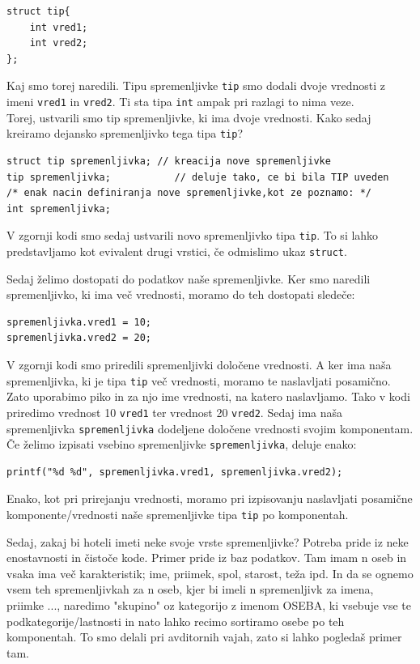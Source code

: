 \documentclass[a4paper, 12pt]{article}
\begin{document}
\begin{lstlisting}
struct tip{
	int vred1;
	int vred2;
};
\end{lstlisting}

Kaj smo torej naredili. Tipu spremenljivke \lstinline|tip| smo dodali dvoje vrednosti z imeni \lstinline|vred1| in \lstinline|vred2|. Ti sta tipa \lstinline|int| ampak pri razlagi to nima veze.\\
Torej, ustvarili smo tip spremenljivke, ki ima dvoje vrednosti. Kako sedaj kreiramo dejansko spremenljivko tega tipa \lstinline|tip|?

\begin{lstlisting}
struct tip spremenljivka; // kreacija nove spremenljivke
tip spremenljivka;			 // deluje tako, ce bi bila TIP uveden
/* enak nacin definiranja nove spremenljivke,kot ze poznamo: */
int spremenljivka;
\end{lstlisting}

V zgornji kodi smo sedaj ustvarili novo spremenljivko tipa \lstinline|tip|. To si lahko predstavljamo kot evivalent drugi vrstici, če odmislimo ukaz \lstinline|struct|. 

Sedaj želimo dostopati do podatkov naše spremenljivke. Ker smo naredili spremenljivko, ki ima več vrednosti, moramo do teh dostopati sledeče:

\begin{lstlisting}
spremenljivka.vred1 = 10;
spremenljivka.vred2 = 20;
\end{lstlisting}

V zgornji kodi smo priredili spremenljivki določene vrednosti. A ker ima naša spremenljivka, ki je tipa \lstinline|tip| več vrednosti, moramo te naslavljati posamično. Zato uporabimo piko in za njo ime vrednosti, na katero naslavljamo. Tako v kodi priredimo vrednost 10 \lstinline|vred1| ter vrednost 20 \lstinline|vred2|. Sedaj ima naša spremenljivka \lstinline|spremenljivka| dodeljene določene vrednosti svojim komponentam. Če želimo izpisati vsebino spremenljivke \lstinline|spremenljivka|, deluje enako:

\begin{lstlisting}
printf("%d %d", spremenljivka.vred1, spremenljivka.vred2);
\end{lstlisting}

Enako, kot pri prirejanju vrednosti, moramo pri izpisovanju naslavljati posamične komponente/vrednosti naše spremenljivke tipa \lstinline|tip| po komponentah.\

Sedaj, zakaj bi hoteli imeti neke svoje vrste spremenljivke? Potreba pride iz neke enostavnosti in čistoče kode. Primer pride iz baz podatkov. Tam imam n oseb in vsaka ima več karakteristik; ime, priimek, spol, starost, teža ipd. In da se ognemo vsem teh spremenljivkah za n oseb, kjer bi imeli n spremenljivk za imena, priimke ..., naredimo "skupino" oz kategorijo z imenom OSEBA, ki vsebuje vse te podkategorije/lastnosti in nato lahko recimo sortiramo osebe po teh komponentah. To smo delali pri avditornih vajah, zato si lahko pogledaš primer tam.\
\end{document}
